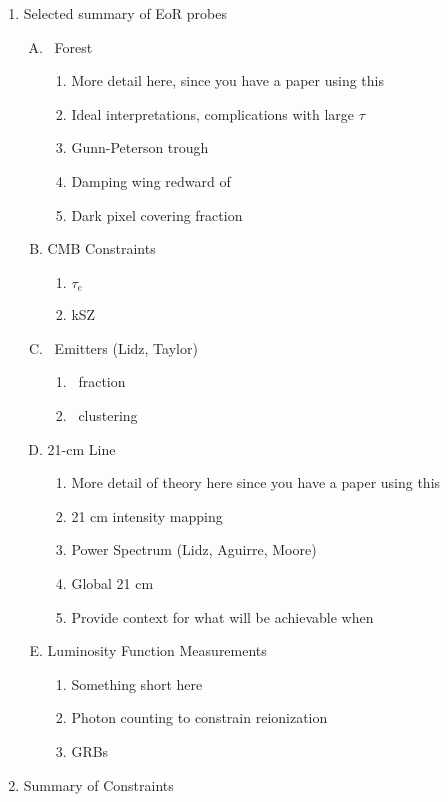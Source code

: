 \documentclass[11pt]{article}
\begin{document}
\begin{enumerate}
\begin{enumerate}[1.]
\item Selected summary of EoR probes
\begin{enumerate}[A.]
\item \lya\ Forest
\begin{enumerate}[$\to$]
\item More detail here, since you have a paper using this
\item Ideal interpretations, complications with large $\tau$
\item Gunn-Peterson trough
\item Damping wing redward of \lya
\item Dark pixel covering fraction
\end{enumerate}
\item CMB Constraints
\begin{enumerate}[$\to$]
\item $\tau_{e}$
\item kSZ
\end{enumerate}
\item \lya\ Emitters (Lidz, Taylor)
\begin{enumerate}[$\to$]
\item \lya\ fraction
\item \lya\ clustering
\end{enumerate}
\item 21-cm Line
\begin{enumerate}[$\to$]
\item More detail of theory here since you have a paper using this
\item 21 cm intensity mapping
\item Power Spectrum (Lidz, Aguirre, Moore)
\item Global 21 cm
\item Provide context for what will be achievable when
\end{enumerate}
\item Luminosity Function Measurements
\begin{enumerate}[$\to$]
\item Something short here
\item Photon counting to constrain reionization
\item GRBs
\end{enumerate}
\end{enumerate}
\item Summary of Constraints
\begin{enumerate}[A.]

\end{enumerate}
\end{enumerate}
\end{enumerate}
\end{document}
